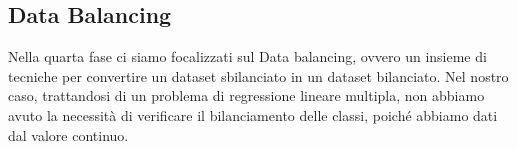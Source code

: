 \newpage
\label{paragrafo 3.4}
\subsection{Data Balancing}

Nella quarta fase ci siamo focalizzati sul Data balancing, ovvero un insieme di tecniche per convertire un dataset sbilanciato in un dataset bilanciato. Nel nostro caso, trattandosi di un problema di regressione lineare multipla, non abbiamo avuto la necessità di verificare il bilanciamento delle classi, poiché abbiamo dati dal valore continuo.


